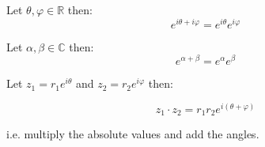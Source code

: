 \begin{thm}
	Let $\theta, \varphi \in \mathbb{R}$ then:
	\[e^{i\theta + i\varphi} = e^{i\theta}e^{i\varphi}\]
\end{thm}
\begin{thm}
	Let $\alpha, \beta \in \mathbb{C}$ then:
	\[e^{\alpha + \beta} = e^{\alpha}e^{\beta}\]
\end{thm}
\begin{thm}
	Let $z_1 = r_1 e^{i\theta}$ and $z_2 = r_2 e^{i\varphi}$ then:

	\[z_1 \cdot z_2 = r_1 r_2 e^{i(\theta + \varphi)} \]

	i.e. multiply the absolute values and add the angles.
\end{thm}
\newpage
